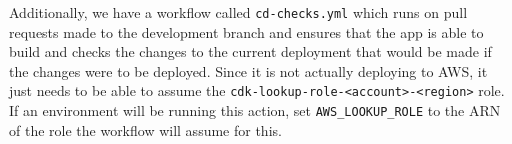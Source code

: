 \documentclass{article}
\begin{document}
Additionally, we have a workflow called \verb|cd-checks.yml| which runs on pull 
requests made to the development branch and ensures that the app is able to build and
checks the changes to the current deployment that would be made if the changes were to 
be deployed. Since it is not actually deploying to AWS, it just needs to be able to 
assume the \verb|cdk-lookup-role-<account>-<region>| role. If an environment will be
running this action, set \verb|AWS_LOOKUP_ROLE| to the ARN of the role the workflow will
assume for this.
\end{document}
